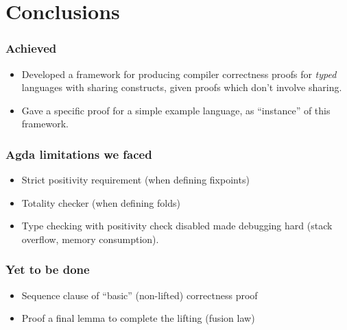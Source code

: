 \section{Conclusions}

    \begin{frame}
        \frametitle{Achieved}

        \begin{itemize}
            \item Developed a framework for producing compiler correctness proofs
                for \emph{typed} languages with sharing constructs, given proofs which don't involve sharing.

           \item Gave a specific proof for a simple example language, as ``instance'' of this framework.
        \end{itemize}
    \end{frame}

    \begin{frame}
        \frametitle{Agda limitations we faced}

        \begin{itemize}
            \item Strict positivity requirement (when defining fixpoints)
            \item Totality checker (when defining folds)
            \item Type checking with positivity check disabled made debugging hard (stack overflow, memory consumption).
        \end{itemize}
    \end{frame}
             
    \begin{frame}
        \frametitle{Yet to be done}

        \begin{itemize}
            \item Sequence clause of ``basic'' (non-lifted) correctness proof
            \item Proof a final lemma to complete the lifting (fusion law)
        \end{itemize}
    \end{frame}

